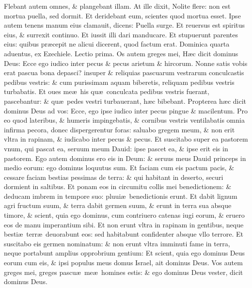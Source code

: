 \documentclass[a5paper,10pt]{book}
\def\rightmarginnote{%
	\lrmarginnote{\hskip\columnwidth \hskip -1em}}
\def\ae{æ}
\begin{document}
\begin{multicols*}{2}
Flebant autem omnes, \& plangebant illam. At ille dixit, Nolite flere: non est mortua puella, sed dormit.
Et deridebant eum, scientes quod mortua esset.
Ipse autem tenens manum eius clamauit, dicens: Puella surge.
Et reuersus est spiritus eius, \& surrexit continuo. Et iussit illi dari manducare.
Et stupuerunt parentes eius: quibus pr\ae cepit ne alicui dicerent, quod factum erat.
\newline {} \color{red} \hypertarget{SUN-QVARTA-ADV}{Dominica quarta aduentus,} ex Ezechiele. \hfill Lectio prima. \color{black}
\vspace{-1.25em}
Os\rightmarginnote{c. 34.} autem greges mei, H\ae c dicit dominus Deus: Ecce ego iudico inter pecus \& pecus arietum \& hircorum.
Nonne satis vobis erat pascua bona depasci? insuper \& reliquias pascuarum vestrarum conculcastis pedibus vestris: \& cum purissimam
aquam biberetis, reliquam pedibus vestris turbabatis.
Et oues me\ae \ his qu\ae \ conculcata pedibus vestris fuerant, pascebantur: \& qu\ae \ pedes vestri turbauerant, h\ae c bibebant.
Propterea h\ae c dicit dominus Deus ad vos: Ecce, ego ipse iudico inter pecus pingue \& macilentum.
Pro eo quod lateribus, \& humeris impingebatis, \& cornibus vestris ventilabatis omnia infirma pecora, donec dispergerentur foras: saluabo gregem meum, \& non erit vltra in rapinam, \& iudicabo inter pecus \& pecus.
Et suscitabo super ea pastorem vnum, qui pascat ea, seruum meum Dauid: ipse pascet ea, \& ipse erit eis in pastorem.
Ego autem dominus ero eis in Deum: \& seruus meus Dauid princeps in medio eorum: ego dominus loquutus sum.
Et faciam cum eis pactum pacis, \& cessare faciam bestias pessimas de terra: \& qui habitant in deserto, securi dormient in saltibus.
Et ponam eos in circumitu collis mei benedictionem: \& deducam imbrem in tempore suo: pluui\ae \ benedictionis erunt.
Et dabit lignum agri fructum suum, \& terra dabit germen suum, \& erunt in terra sua absque timore, \& scient, quia ego dominus, cum contriuero catenas iugi eorum, \& eruero eos de manu imperantium sibi.
Et non erunt vltra in rapinam in gentibus, neque besti\ae \ terr\ae \ deuorabunt eos: sed habitabunt confidenter absque vllo terrore.
Et suscitabo eis germen nominatum: \& non erunt vltra imminuti fame in terra, neque portabunt amplius opprobrium gentium: Et scient, quia ego dominus Deus eorum cum eis, \& ipsi populus meus domus Israel, ait dominus Deus.
Vos autem greges mei, greges pascu\ae \ me\ae \ homines estis: \& ego dominus Deus vester, dicit dominus Deus.

\end{multicols*}
\end{document}
